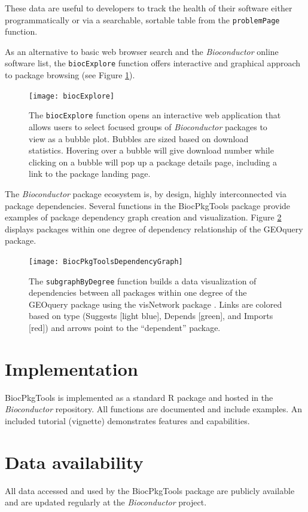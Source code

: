 \documentclass[9pt,a4paper]{extarticle}\usepackage[]{graphicx}\usepackage[]{color}
\begin{document}
These data are useful to developers to track the health of their
software either programmatically or via a searchable, sortable table
from the \texttt{problemPage} function.

As an alternative to basic web browser search and the
\emph{Bioconductor} online software list, the \texttt{biocExplore}
function offers interactive and graphical approach to package browsing
(see Figure \ref{fig:biocexplore}).

\begin{figure}
  \texttt{[image: biocExplore]}
  \caption{The \texttt{biocExplore} function opens an interactive web application that allows users to select focused groups of \emph{Bioconductor} packages to view as a bubble plot. Bubbles are sized based on download statistics. Hovering over a bubble will give download number while clicking on a bubble will pop up a package details page, including a link to the package landing page.}
  \label{fig:biocexplore}
\end{figure}

The \emph{Bioconductor} package ecosystem is, by design, highly
interconnected via package dependencies. Several functions in the
BiocPkgTools package provide examples of package dependency graph
creation and visualization. Figure \ref{fig:dependencygraph} displays
packages within one degree of dependency relationship of the GEOquery
package.

\begin{figure}
  \texttt{[image: BiocPkgToolsDependencyGraph]}
  \caption{The \texttt{subgraphByDegree} function builds a data
    visualization of dependencies between all packages within one
    degree of the GEOquery package using the visNetwork package
    \citep{visNetwork}. Links are colored based on type (Suggests [light blue],
    Depends [green], and Imports [red]) and arrows point to the ``dependent''
    package. }
  \label{fig:dependencygraph}
\end{figure}

\section*{Implementation}

BiocPkgTools is implemented as a standard R package and hosted in the
\emph{Bioconductor} repository. All functions are documented and include
examples. An included tutorial (vignette) demonstrates features and
capabilities. 

\section*{Data availability} %
All data accessed and used by the BiocPkgTools package are publicly available and are updated regularly at the \emph{Bioconductor} project. 
\end{document}
